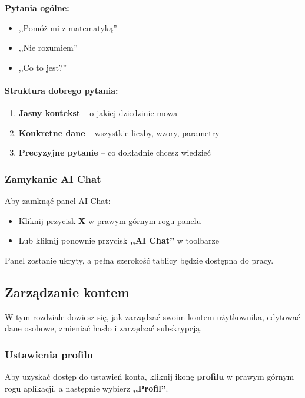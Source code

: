 \documentclass[12pt,a4paper]{article}
\begin{document}
\textbf{Pytania ogólne:}
\begin{itemize}
    \item ,,Pomóż mi z matematyką''
    \item ,,Nie rozumiem''
    \item ,,Co to jest?''
\end{itemize}

\paragraph{Struktura dobrego pytania:}

\begin{enumerate}
    \item \textbf{Jasny kontekst} -- o jakiej dziedzinie mowa
    \item \textbf{Konkretne dane} -- wszystkie liczby, wzory, parametry
    \item \textbf{Precyzyjne pytanie} -- co dokładnie chcesz wiedzieć
\end{enumerate}

\subsubsection{Zamykanie AI Chat}

Aby zamknąć panel AI Chat:

\begin{itemize}
    \item Kliknij przycisk \textbf{X} w prawym górnym rogu panelu
    \item Lub kliknij ponownie przycisk \textbf{,,AI Chat''} w toolbarze
\end{itemize}

Panel zostanie ukryty, a pełna szerokość tablicy będzie dostępna do pracy.

\subsection{Zarządzanie kontem}

W tym rozdziale dowiesz się, jak zarządzać swoim kontem użytkownika, edytować dane osobowe, zmieniać hasło i zarządzać subskrypcją.

\subsubsection{Ustawienia profilu}

Aby uzyskać dostęp do ustawień konta, kliknij ikonę \textbf{profilu} w prawym górnym rogu aplikacji, a następnie wybierz \textbf{,,Profil''}.
\end{document}
